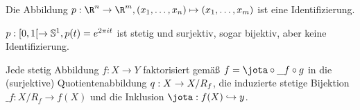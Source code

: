 \begin{ex}
	Die Abbildung $p: \R^n \to \R^m, (x_1, \dotsc, x_n) \mapsto (x_1, \dotsc, x_m)$ ist eine Identifizierung.
\end{ex}

\begin{ex}
	$p: [0,1[ \to \S^1, p(t) = e^{2\pi i t}$ ist stetig und surjektiv, sogar bijektiv, aber keine Identifizierung.
\end{ex}

\begin{st}
	Jede stetig Abbildung $f: X \to Y$ faktorisiert gemäß $f = \jota \circ \_f \circ g$ in die (surjektive) Quotientenabbildung $q: X \surto X / R_f$, die induzierte stetige Bijektion $\_f: X / R_f \to f(X)$ und die Inklusion $\jota: f(X) \injto y$.
\end{st}

